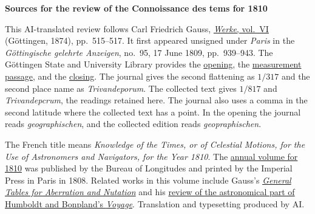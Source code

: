 \clearpage\thispagestyle{empty}
\begin{center}\textbf{Sources for the review of the Connoissance des tems for 1810}\end{center}
\noindent This AI-translated review follows Carl Friedrich Gauss, \href{https://gdz.sub.uni-goettingen.de/id/PPN236007467}{\emph{Werke}, vol.~VI} (Göttingen, 1874), pp.~515–517. It first appeared unsigned under \emph{Paris} in the \emph{Göttingische gelehrte Anzeigen}, no.~95, 17 June 1809, pp.~939–943. The Göttingen State and University Library provides the \href{https://images.p.sub.uni-goettingen.de/iiif/image/gdz:PPN319721507_1809:00000941/full/1650,/0/default.jpg}{opening}, the \href{https://images.p.sub.uni-goettingen.de/iiif/image/gdz:PPN319721507_1809:00000943/full/1650,/0/default.jpg}{measurement passage}, and the \href{https://images.p.sub.uni-goettingen.de/iiif/image/gdz:PPN319721507_1809:00000945/full/1650,/0/default.jpg}{closing}. The journal gives the second flattening as $1/317$ and the second place name as \emph{Trivandeporum}. The collected text gives $1/817$ and \emph{Trivandepcrum}, the readings retained here. The journal also uses a comma in the second latitude where the collected text has a point. In the opening the journal reads \emph{geographischen}, and the collected edition reads \emph{geopraphischen}.
\par\smallskip\noindent The French title means \emph{Knowledge of the Times, or of Celestial Motions, for the Use of Astronomers and Navigators, for the Year 1810}. The \href{https://cdt.imcce.fr/items/show/159}{annual volume for 1810} was published by the Bureau of Longitudes and printed by the Imperial Press in Paris in 1808. Related works in this volume include Gauss’s \hyperlink{native-128}{\emph{General Tables for Aberration and Nutation}} and his \hyperlink{native-517-lower}{review of the astronomical part of Humboldt and Bonpland’s \emph{Voyage}}. Translation and typesetting produced by AI.
\clearpage
